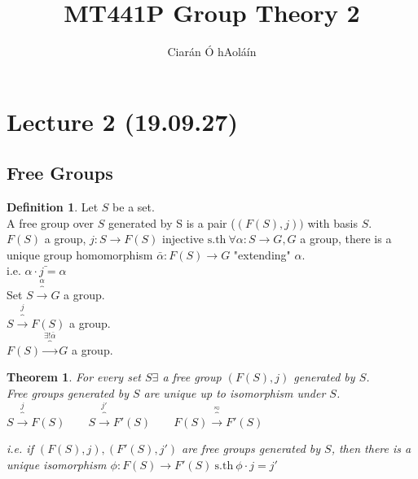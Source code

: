\documentclass{article}
\title{MT441P Group Theory 2}
\author{Ciarán Ó hAoláín}
\newcommand{\sth}{\mathrm{s.th\ }}
\newtheorem{theorem}{Theorem}[section]
\theoremstyle{definition}
\newtheorem{definition}{Definition}[section]
\theoremstyle{remark}
\theoremstyle{example}
\begin{document}
	\maketitle
	
	\section{Lecture 2 (19.09.27)}
	\subsection{Free Groups}
	\begin{definition}
		Let $S$ be a set.\\
		A free group over $S$ generated by S is a pair ($(F(S),j))$ with basis $S$.\\
		$F(S)$ a group, $j:S \to F(S)$ injective $\sth \forall \alpha:S \to G, G$ a group, there is a unique group homomorphism $\bar{\alpha}:F(S) \to G$ "extending" $\alpha$.\\
		i.e. $\bar{\alpha\cdot j = \alpha}$		\\
		Set $S \overbrace{\to}^\alpha G$ a group.\\
		$S \overbrace{\to}^j F(S)$ a group.\\
		$F(S) \overbrace{\to}^{\exists!\bar{\alpha}} G$ a group.
	\end{definition}
	
	
	\begin{theorem}
		For every set $S \exists $ a free group $(F(S), j)$ generated by $S$.\\
		Free groups generated by $S$ are unique up to isomorphism under $S$.\\
		$S \overbrace{\to}^j F(S)\qquad
		S \overbrace{\to}^{j'} F'(S)\qquad
		F(S) \overbrace{\to}^\eqsim F'(S)$
		
		i.e. if $(F(S),j),(F'(S),j')$ are free groups generated by $S$, then there is a unique isomorphism $\phi:F(S) \to F'(S) \ \sth \phi \cdot j = j'$
	\end{theorem}
\end{document}
